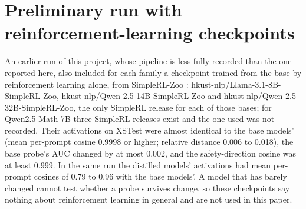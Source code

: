 \documentclass[10pt]{article}
\begin{document}
\clearpage
\setcounter{figure}{0}\setcounter{table}{0}
\section{Preliminary run with reinforcement-learning checkpoints}
\label{app:earlier}
An earlier run of this project, whose pipeline is less fully recorded than the one reported here, also included for each family a checkpoint trained from the base by reinforcement learning alone, from SimpleRL-Zoo \citep{zeng2025}: hkust-nlp/Llama-3.1-8B-SimpleRL-Zoo, hkust-nlp/Qwen-2.5-14B-SimpleRL-Zoo and hkust-nlp/Qwen-2.5-32B-SimpleRL-Zoo, the only SimpleRL release for each of those bases; for Qwen2.5-Math-7B three SimpleRL releases exist and the one used was not recorded. Their activations on XSTest were almost identical to the base models' (mean per-prompt cosine 0.9998 or higher; relative distance 0.006 to 0.018), the base probe's AUC changed by at most 0.002, and the safety-direction cosine was at least 0.999. In the same run the distilled models' activations had mean per-prompt cosines of 0.79 to 0.96 with the base models'. A model that has barely changed cannot test whether a probe survives change, so these checkpoints say nothing about reinforcement learning in general and are not used in this paper.
\end{document}
